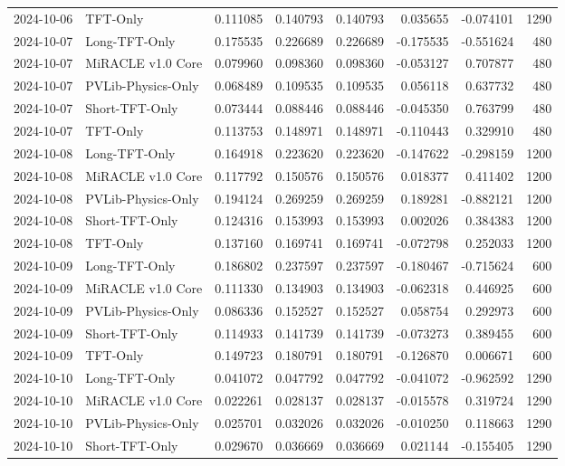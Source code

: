 \begin{tabular}{llrrrrrr}
2024-10-06 & TFT-Only & 0.111085 & 0.140793 & 0.140793 & 0.035655 & -0.074101 & 1290 \\
2024-10-07 & Long-TFT-Only & 0.175535 & 0.226689 & 0.226689 & -0.175535 & -0.551624 & 480 \\
2024-10-07 & MiRACLE v1.0 Core & 0.079960 & 0.098360 & 0.098360 & -0.053127 & 0.707877 & 480 \\
2024-10-07 & PVLib-Physics-Only & 0.068489 & 0.109535 & 0.109535 & 0.056118 & 0.637732 & 480 \\
2024-10-07 & Short-TFT-Only & 0.073444 & 0.088446 & 0.088446 & -0.045350 & 0.763799 & 480 \\
2024-10-07 & TFT-Only & 0.113753 & 0.148971 & 0.148971 & -0.110443 & 0.329910 & 480 \\
2024-10-08 & Long-TFT-Only & 0.164918 & 0.223620 & 0.223620 & -0.147622 & -0.298159 & 1200 \\
2024-10-08 & MiRACLE v1.0 Core & 0.117792 & 0.150576 & 0.150576 & 0.018377 & 0.411402 & 1200 \\
2024-10-08 & PVLib-Physics-Only & 0.194124 & 0.269259 & 0.269259 & 0.189281 & -0.882121 & 1200 \\
2024-10-08 & Short-TFT-Only & 0.124316 & 0.153993 & 0.153993 & 0.002026 & 0.384383 & 1200 \\
2024-10-08 & TFT-Only & 0.137160 & 0.169741 & 0.169741 & -0.072798 & 0.252033 & 1200 \\
2024-10-09 & Long-TFT-Only & 0.186802 & 0.237597 & 0.237597 & -0.180467 & -0.715624 & 600 \\
2024-10-09 & MiRACLE v1.0 Core & 0.111330 & 0.134903 & 0.134903 & -0.062318 & 0.446925 & 600 \\
2024-10-09 & PVLib-Physics-Only & 0.086336 & 0.152527 & 0.152527 & 0.058754 & 0.292973 & 600 \\
2024-10-09 & Short-TFT-Only & 0.114933 & 0.141739 & 0.141739 & -0.073273 & 0.389455 & 600 \\
2024-10-09 & TFT-Only & 0.149723 & 0.180791 & 0.180791 & -0.126870 & 0.006671 & 600 \\
2024-10-10 & Long-TFT-Only & 0.041072 & 0.047792 & 0.047792 & -0.041072 & -0.962592 & 1290 \\
2024-10-10 & MiRACLE v1.0 Core & 0.022261 & 0.028137 & 0.028137 & -0.015578 & 0.319724 & 1290 \\
2024-10-10 & PVLib-Physics-Only & 0.025701 & 0.032026 & 0.032026 & -0.010250 & 0.118663 & 1290 \\
2024-10-10 & Short-TFT-Only & 0.029670 & 0.036669 & 0.036669 & 0.021144 & -0.155405 & 1290 \\

\end{tabular}
